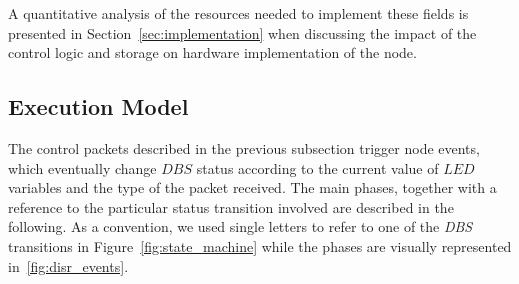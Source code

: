A quantitative analysis of the resources needed to implement these
fields is presented in Section~\ref{sec:implementation} when
discussing the impact of the \disr{} control logic and storage on
hardware implementation of the node.

\subsection{Execution Model}
\label{sub:phases}

The \disr{} control packets described in the previous subsection trigger
node events, which eventually change $DBS$ status according to the
current value of $LED$ variables and the type of the packet received.
The main \disr{} phases, together with a reference to the particular
status transition involved are described in the following. As a
convention, we used single letters to refer to one of the \emph{DBS} transitions in
Figure~\ref{fig:state_machine} while the phases are visually
represented in~\ref{fig:disr_events}.


